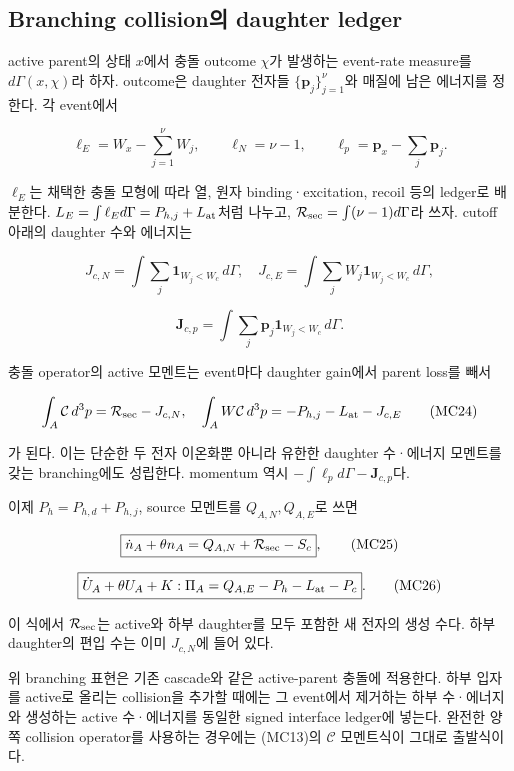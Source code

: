 \hypertarget{branching-collisionuxc758-daughter-ledger}{%
\subsection{Branching collision의 daughter ledger}\label{branching-collisionuxc758-daughter-ledger}}

active parent의 상태 \(x\)에서 충돌 outcome \(\chi\)가 발생하는 event-rate measure를 \(d\Gamma(x,\chi)\)라 하자. outcome은 daughter 전자들 \(\{\boldsymbol p_j\}_{j=1}^{\nu}\)와 매질에 남은 에너지를 정한다. 각 event에서

\[
\ell_E=W_x-\sum_{j=1}^{\nu}W_j,
\qquad\ell_{N}=\nu-1,
\qquad\boldsymbol\ell_p=\boldsymbol p_x-\sum_j\boldsymbol p_j.
\tag{MC21}
\]

\(\ell_E\)는 채택한 충돌 모형에 따라 열, 원자 binding·excitation, recoil 등의 ledger로 배분한다. \(L_E=\int\ell_Ed\Gamma=P_{h,j}+L_{\rm at}\)처럼 나누고, \(\mathcal R_{\rm sec}=\int(\nu-1)d\Gamma\)라 쓰자. cutoff 아래의 daughter 수와 에너지는

\[
J_{c,N}=\int\sum_j\mathbf1_{W_j<W_c}\,d\Gamma,
\quad
J_{c,E}=\int\sum_jW_j\mathbf1_{W_j<W_c}\,d\Gamma,
\tag{MC22}
\]

\[
\boldsymbol J_{c,p}=\int\sum_j\boldsymbol p_j\mathbf1_{W_j<W_c}\,d\Gamma.
\tag{MC23}
\]

충돌 operator의 active 모멘트는 event마다 daughter gain에서 parent loss를 빼서

\[
\int_A\mathcal C\,d^3p=\mathcal R_{\rm sec}-J_{c,N},
\quad
\int_AW\mathcal C\,d^3p=-P_{h,j}-L_{\rm at}-J_{c,E}
\tag{MC24}
\]

가 된다. 이는 단순한 두 전자 이온화뿐 아니라 유한한 daughter 수·에너지 모멘트를 갖는 branching에도 성립한다. momentum 역시 \(-\int\boldsymbol\ell_pd\Gamma-\boldsymbol J_{c,p}\)다.

이제 \(P_h=P_{h,d}+P_{h,j}\), source 모멘트를 \(Q_{A,N},Q_{A,E}\)로 쓰면

\[
\boxed{\dot n_A+\theta n_A=Q_{A,N}+\mathcal R_{\rm sec}-S_c},
\tag{MC25}
\]

\[
\boxed{\dot U_A+\theta U_A+K:\Pi_A
=Q_{A,E}-P_h-L_{\rm at}-P_c}.
\tag{MC26}
\]

이 식에서 \(\mathcal R_{\rm sec}\)는 active와 하부 daughter를 모두 포함한 새 전자의 생성 수다. 하부 daughter의 편입 수는 이미 \(J_{c,N}\)에 들어 있다.

위 branching 표현은 기존 cascade와 같은 active-parent 충돌에 적용한다. 하부 입자를 active로 올리는 collision을 추가할 때에는 그 event에서 제거하는 하부 수·에너지와 생성하는 active 수·에너지를 동일한 signed interface ledger에 넣는다. 완전한 양쪽 collision operator를 사용하는 경우에는 (MC13)의 \(\mathcal C\) 모멘트식이 그대로 출발식이다.

